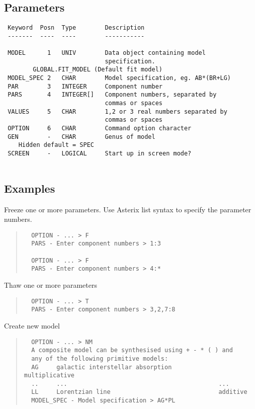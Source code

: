 \documentclass{book}
\renewcommand{\_}{{\tt\char'137}}     %
\begin{document}
\subsection{Parameters}
\begin{verbatim}
 Keyword  Posn  Type        Description
 -------  ----  ----        -----------
 
 MODEL      1   UNIV        Data object containing model
                            specification.
        GLOBAL.FIT_MODEL (Default fit model)
 MODEL_SPEC 2   CHAR        Model specification, eg. AB*(BR+LG)
 PAR        3   INTEGER     Component number
 PARS       4   INTEGER[]   Component numbers, separated by
                            commas or spaces
 VALUES     5   CHAR        1,2 or 3 real numbers separated by
                            commas or spaces
 OPTION     6   CHAR        Command option character
 GEN        -   CHAR        Genus of model
    Hidden default = SPEC
 SCREEN     -   LOGICAL     Start up in screen mode?
 
\end{verbatim}\subsection{Examples}
Freeze one or more parameters. Use Asterix list syntax to specify
the parameter numbers.
\begin{quote}\begin{verbatim}
  OPTION - ... > F
  PARS - Enter component numbers > 1:3
 
  OPTION - ... > F
  PARS - Enter component numbers > 4:*
\end{verbatim}\end{quote}
Thaw one or more parameters
\begin{quote}\begin{verbatim}
  OPTION - ... > T
  PARS - Enter component numbers > 3,2,7:8
\end{verbatim}\end{quote}
Create new model
\begin{quote}\begin{verbatim}
  OPTION - ... > NM
  A composite model can be synthesised using + - * ( ) and
  any of the following primitive models:
  AG     galactic interstellar absorption             multiplicative
  ..     ...                                          ...
  LL     Lorentzian line                              additive
  MODEL_SPEC - Model specification > AG*PL
\end{verbatim}\end{quote}
\end{document}
